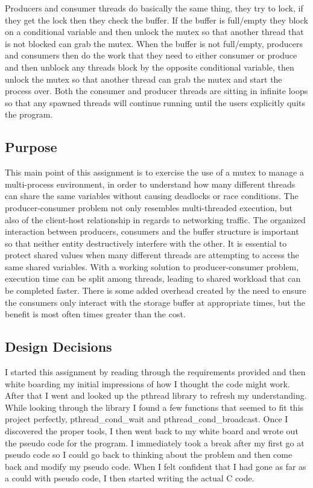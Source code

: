 \documentclass[letterpaper,10pt]{article}
\begin{document}
Producers and consumer threads do basically the same thing, they try to lock, if they get the lock then they check the buffer. If the buffer is full/empty they block on a conditional variable and then unlock the mutex so that another thread that is not blocked can grab the mutex. When the buffer is not full/empty, producers and consumers then do the work that they need to either consumer or produce and then unblock any threads block by the opposite conditional variable, then unlock the mutex so that another thread can grab the mutex and start the process over. Both the consumer and producer threads are sitting in infinite loops so that any spawned threads will continue running until the users explicitly quits the program.

\subsection{Purpose}
This main point of this assignment is to exercise the use of a mutex to manage a multi-process environment, in order to understand how many different threads can share the same variables without causing deadlocks or race conditions. The producer-consumer problem not only resembles multi-threaded execution, but also of the client-host relationship in regards to networking traffic. The organized interaction between producers, consumers and the buffer structure is important so that neither entity destructively interfere with the other. It is essential to protect shared values when many different threads are attempting to access the same shared variables. With a working solution to producer-consumer problem, execution time can be split among threads, leading to shared workload that can be completed faster. There is some added overhead created by the need to ensure the consumers only interact with the storage buffer at appropriate times, but the benefit is most often times greater than the cost.

\subsection{Design Decisions}
I started this assignment by reading through the requirements provided and then white boarding my initial impressions of how I thought the code might work. After that I went and looked up the pthread library to refresh my understanding. While looking through the library I found a few functions that seemed to fit this project perfectly, pthread\_cond\_wait and pthread\_cond\_broadcast. Once I discovered the proper tools, I then went back to my white board and wrote out the pseudo code for the program. I immediately took a break after my first go at pseudo code so I could go back to thinking about the problem and then come back and modify my pseudo code. When I felt confident that I had gone as far as a could with pseudo code, I then started writing the actual C code. 
\end{document}
